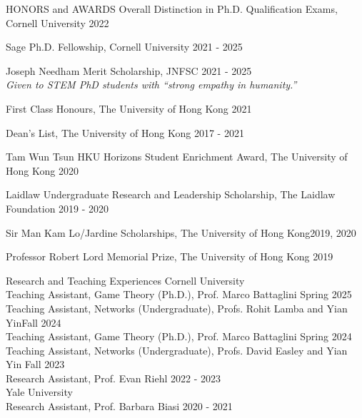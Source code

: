 \documentclass{resume} %
\begin{document}
\vspace{2em}
\begin{rSection}{HONORS and AWARDS}
Overall Distinction in Ph.D. Qualification Exams, Cornell University \hfill 2022

Sage Ph.D. Fellowship, Cornell University \hfill 2021 - 2025

Joseph Needham Merit Scholarship, JNFSC \hfill 2021 - 2025 \\
\emph{Given to STEM PhD students with ``strong empathy in humanity.''}

First Class Honours, The University of Hong Kong \hfill 2021

Dean's List, The University of Hong Kong \hfill 2017 - 2021

Tam Wun Tsun HKU Horizons Student Enrichment Award, The University of Hong Kong \hfill 2020

Laidlaw Undergraduate Research and Leadership Scholarship, The Laidlaw Foundation \hfill 2019 - 2020

Sir Man Kam Lo/Jardine Scholarships, The University of Hong Kong\hfill 2019, 2020

Professor Robert Lord Memorial Prize, The University of Hong Kong \hfill 2019 

\end{rSection}


\begin{rSection}{Research and Teaching Experiences}
Cornell University \\
\-\hspace{1em} Teaching Assistant, Game Theory (Ph.D.), Prof. Marco Battaglini \hfill Spring 2025 \\
\-\hspace{1em} Teaching Assistant, Networks (Undergraduate), Profs. Rohit Lamba and Yian Yin\hfill Fall 2024 \\
\-\hspace{1em} Teaching Assistant, Game Theory (Ph.D.), Prof. Marco Battaglini \hfill Spring 2024 \\
\-\hspace{1em} Teaching Assistant, Networks (Undergraduate), Profs. David Easley and Yian Yin \hfill Fall 2023 \\
\-\hspace{1em} Research Assistant, Prof. Evan Riehl \hfill 2022 - 2023 \\
Yale University \\
\-\hspace{1em} Research Assistant, Prof. Barbara Biasi \hfill 2020 - 2021
\end{rSection}
\end{document}
